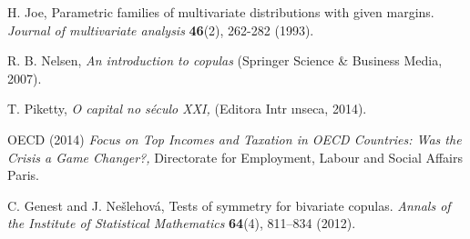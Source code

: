 \documentclass{aip-cp}
\begin{document}
\begin{thebibliography}{00}
 H. Joe, Parametric families of multivariate distributions with given margins. {\it{Journal of multivariate analysis}} {\bf{46}}(2), 262-282 (1993).

 R. B. Nelsen, {\it{An introduction to copulas}} (Springer Science \& Business Media, 2007).

 T. Piketty, {\it{O capital no s\'{e}culo XXI,}} (Editora Intr\'{ \i}nseca, 2014).

OECD (2014) {\it{Focus on Top Incomes and Taxation in OECD Countries: Was the Crisis a Game Changer?,}} Directorate for Employment, Labour and Social Affairs Paris.

 C. Genest and J. Ne{\v{s}}lehov{\'a}, Tests of symmetry for bivariate copulas. {\it{Annals of the Institute of Statistical Mathematics}} {\bf{64}}(4), 811--834 (2012).


  
\end{thebibliography}
\end{document}
